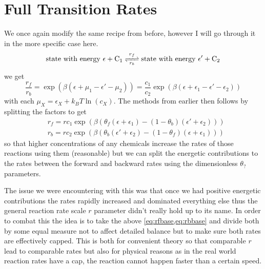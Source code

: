 \documentclass[11pt]{article}
\begin{document}
\section{Full Transition Rates}\label{sec:modtransr}
We once again modify the same recipe from before, however I will go through it in the more specific case here.
\begin{equation}
	\ce{\text{state with energy $\epsilon$} + C_1 <=>[$r_f$][$r_b$] \text{state with energy $\epsilon'$} + C_2}
\end{equation}
we get
\begin{equation}
	\frac{r_f}{r_b} = \exp(\beta(\epsilon + \mu_1 - \epsilon' - \mu_2)) = \frac{c_1}{c_2} \exp(\beta(\epsilon + \epsilon_1 - \epsilon' - \epsilon_2))
\end{equation}
with each $\mu_X = \epsilon_X + \si{k_B}T\ln(c_X)$.
The methods from earlier then follows by splitting the factors to get
\begin{align}
	 & r_f = r c_1 \exp(\beta(\theta_f(\epsilon+\epsilon_1)-(1-\theta_b)(\epsilon'+\epsilon_2))) \label{eq:rfbase} \\
	 & r_b = r c_2 \exp(\beta(\theta_b(\epsilon'+\epsilon_2)-(1-\theta_f)(\epsilon+\epsilon_1))) \label{eq:rbbase}
\end{align}
so that higher concentrations of any chemicals increase the rates of those reactions using them (reasonable) but we can split the energetic contributions to the rates between the forward and backward rates using the dimensionless $\theta_?$ parameters.

The issue we were encountering with this was that once we had positive energetic contributions the rates rapidly increased and dominated everything else thus the general reaction rate scale $r$ parameter didn't really hold up to its name.
In order to combat this the idea is to take the above \cref{eq:rfbase,eq:rbbase} and divide both by some equal measure not to affect detailed balance but to make sure both rates are effectively capped.
This is both for convenient theory so that comparable $r$ lead to comparable rates but also for physical reasons as in the real world reaction rates have a cap, the reaction cannot happen faster than a certain speed.
\end{document}
